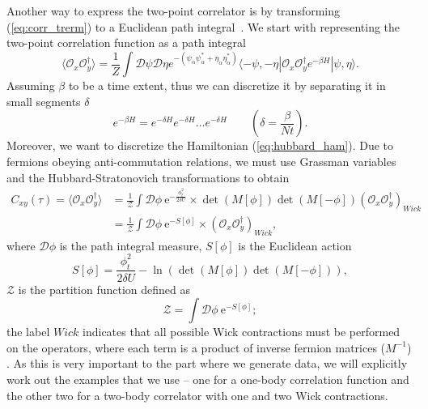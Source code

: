 Another way to express the two-point correlator is by transforming (\cref{eq:corr_trerm}) to a Euclidean path integral~\cite{discret1,discret2}. We start with representing the two-point correlation function as a path integral
\begin{equation}
    \langle \mathcal{O}_x\mathcal{O}^\dagger_y \rangle = \frac{1}{Z} \int \mathcal{D}\psi\mathcal{D}\eta e^{-(\psi_\alpha\psi^*_\alpha + \eta_\alpha\eta^*_\alpha)} \langle -\psi,-\eta | \mathcal{O}_x\mathcal{O}^\dagger_y e^{-\beta H} | \psi,\eta \rangle.
\end{equation}
Assuming $\beta$ to be a time extent, thus we can discretize it by separating it in small segments $\delta$
\begin{equation}
    e^{-\beta H} = e^{-\delta H}e^{-\delta H}\dots e^{-\delta H}\qquad(\delta = \frac{\beta}{Nt}).
\end{equation}
Moreover, we want to discretize the Hamiltonian (\cref{eq:hubbard_ham}). Due to fermions obeying anti-commutation relations, we must use Grassman variables and the Hubbard-Stratonovich transformations to obtain
\begin{equation}
    \begin{aligned}
        C_{xy}(\tau) = \langle \mathcal{O}_x\mathcal{O}^\dagger_y \rangle &= \frac{1}{\mathcal{Z}} \int \mathcal{D}\phi \:\mathrm{e}^{-\frac{\phi^2_t}{2\delta U}}\times \det(M[\phi])\det(M[-\phi]) \left(\mathcal{O}_x\mathcal{O}^\dagger_y\right)_{Wick}
        \\
        &= \frac{1}{\mathcal{Z}} \int \mathcal{D}\phi \:\mathrm{e}^{-S[\phi]}\times \left(\mathcal{O}_x\mathcal{O}^\dagger_y\right)_{Wick},
    \end{aligned}
    \label{eq:path-int}
\end{equation}
where $\mathcal{D}\phi$ is the path integral measure, $S[\phi]$ is the Euclidean action
\begin{equation}
    S[\phi] = \frac{\phi^2_t}{2\delta U} - \ln(\det(M[\phi])\det(M[-\phi])),
\end{equation} 
$\mathcal{Z}$ is the partition function defined as
\begin{equation}
    \mathcal{Z} = \int \mathcal{D}\phi \:\mathrm{e}^{-S[\phi]};
\end{equation}
the label $Wick$ indicates that all possible Wick contractions must be performed on the operators, where each term is a product of inverse fermion matrices ($M^{-1}$) \cite{gattringer}. As this is very important to the part where we generate data, we will explicitly work out the examples that we use -- one for a one-body correlation function and the other two for a two-body correlator with one and two Wick contractions.

